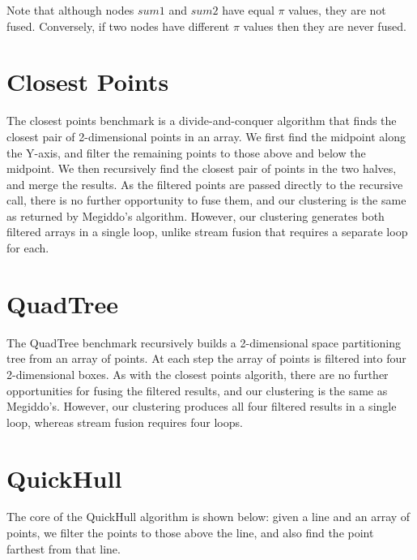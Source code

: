 Note that although nodes $sum1$ and $sum2$ have equal $\pi$ values, they are not fused. Conversely, if two nodes have different $\pi$ values then they are never fused. 



\section{Closest Points}
The closest points benchmark is a divide-and-conquer algorithm that finds the closest pair of 2-dimensional points in an array. We first find the midpoint along the Y-axis, and filter the remaining points to those above and below the midpoint. We then recursively find the closest pair of points in the two halves, and merge the results. As the filtered points are passed directly to the recursive call, there is no further opportunity to fuse them, and our clustering is the same as returned by Megiddo's algorithm. However, our clustering generates both filtered arrays in a single loop, unlike stream fusion that requires a separate loop for each.


\section{QuadTree}
The QuadTree benchmark recursively builds a 2-dimensional space partitioning tree from an array of points. At each step the array of points is filtered into four 2-dimensional boxes. As with the closest points algorith, there are no further opportunities for fusing the filtered results, and our clustering is the same as Megiddo's. However, our clustering produces all four filtered results in a single loop, whereas stream fusion requires four loops.


\section{QuickHull}
The core of the QuickHull algorithm is shown below: given a line and an array of points, we filter the points to those above the line, and also find the point farthest from that line.

